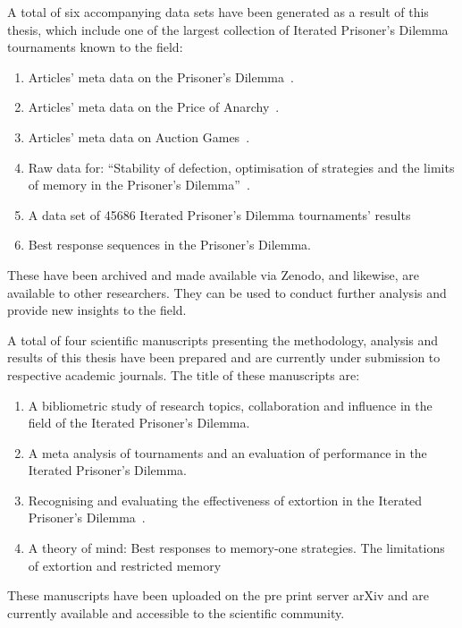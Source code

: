 A total of six accompanying data sets have been generated as a result of this thesis,
which include one of the largest collection of Iterated Prisoner's Dilemma
tournaments known to the field:

\begin{enumerate}
    \item Articles' meta data on the Prisoner's Dilemma~\cite{pd_data_2018}.
    \item Articles' meta data on the Price of Anarchy~\cite{anarchy_data_2018}.
    \item Articles' meta data on Auction Games~\cite{auction_data_2018}.
    \item Raw data for: ``Stability of defection, optimisation of strategies and
    the limits of memory in the Prisoner's Dilemma''~\cite{glynatsi2019}.
    \item A data set of 45686 Iterated Prisoner's Dilemma tournaments' results~\cite{data} %
    \item Best response sequences in the Prisoner's Dilemma. %
\end{enumerate}

These have been archived and made available via Zenodo, and likewise, are
available to other researchers. They can be used to conduct further analysis and
provide new insights to the field.

A total of four scientific manuscripts presenting the methodology, analysis and
results of this thesis have been prepared and are currently under submission to
respective academic journals. The title of these manuscripts are:

\begin{enumerate}
    \item A bibliometric study of research topics, collaboration and influence
    in the field of the Iterated Prisoner's Dilemma.
    \item A meta analysis of tournaments and an evaluation of performance in the
    Iterated Prisoner's Dilemma.
    \item Recognising and evaluating the effectiveness of extortion in the
    Iterated Prisoner's Dilemma~\cite{Knight2019}.
    \item A theory of mind: Best responses to memory-one strategies.
    The limitations of extortion and restricted memory
\end{enumerate} %

These manuscripts have been uploaded on the pre
print server arXiv and are currently available and accessible to the scientific
community.

